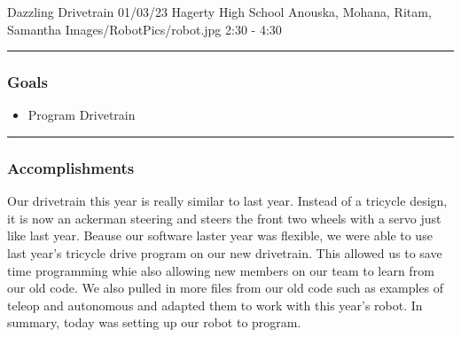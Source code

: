 \insertmeeting 
	{Dazzling Drivetrain} 
	{01/03/23} 
	{Hagerty High School}
	{Anouska, Mohana, Ritam, Samantha}
	{Images/RobotPics/robot.jpg}
	{2:30 - 4:30}
	
\noindent\hfil\rule{\textwidth}{.4pt}\hfil
\subsubsection*{Goals}
\begin{itemize}
    \item Program Drivetrain

\end{itemize} 

\noindent\hfil\rule{\textwidth}{.4pt}\hfil

\subsubsection*{Accomplishments}
Our drivetrain this year is really similar to last year. Instead of a tricycle design, it is now an ackerman steering and steers the front two wheels with a servo just like last year. Beause our software laster year was flexible, we were able to use last year's tricycle drive program on our new drivetrain. This allowed us to save time programming whie also allowing new members on our team to learn from our old code. We also pulled in more files from our old code such as examples of teleop and autonomous and adapted them to work with this year's robot. In summary, today was setting up our robot to program.

 

